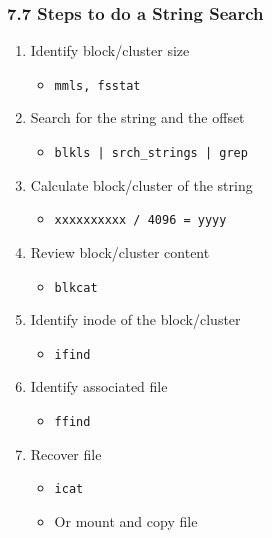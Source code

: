 \begin{frame}[fragile]
  \frametitle{7.7 Steps to do a String Search}
    \begin{enumerate}
       \item Identify block/cluster size
            \begin{itemize}
		\item[] \texttt{mmls, fsstat}
            \end{itemize}
       \item Search for the string and the offset
            \begin{itemize}
		\item[] \texttt{blkls | srch\_strings | grep }
            \end{itemize}
       \item Calculate block/cluster of the string
	    \begin{itemize}
		\item[] \texttt{xxxxxxxxxx / 4096 = yyyy}
            \end{itemize}
       \item Review block/cluster content
	    \begin{itemize}
		\item[] \texttt{blkcat}
            \end{itemize}
       \item Identify inode of the block/cluster
	    \begin{itemize}
		\item[] \texttt{ifind}
            \end{itemize}
       \item Identify associated file
	    \begin{itemize}
		\item[] \texttt{ffind}
            \end{itemize}
       \item Recover file
	    \begin{itemize}
		\item[] \texttt{icat}
		\item[] Or mount and copy file
            \end{itemize}
    \end{enumerate}
\end{frame}


\newcommand{\seti}{\setcounter{saveenumi}{\value{enumi}}}
\newcommand{\conti}{\setcounter{enumi}{\value{saveenumi}}}

